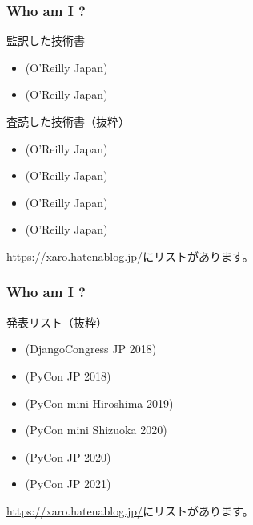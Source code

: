 \documentclass[aspectratio=169,dvipdfmx,12pt,notheorems]{beamer}
\theoremstyle{definition}
\begin{document}
\begin{frame}\frametitle{Who am I ?}

\begin{block}{監訳した技術書}
\begin{itemize}
\item {}(O'Reilly Japan) 
\item {}(O'Reilly Japan)
\end{itemize}
\end{block}

\begin{block}{査読した技術書（抜粋）}
\begin{itemize}
\item {}(O'Reilly Japan)
\item {}(O'Reilly Japan)
\item {}(O'Reilly Japan)
\item {}(O'Reilly Japan) 
\end{itemize}
\end{block}
\url{https://xaro.hatenablog.jp/}にリストがあります。
\end{frame}

\begin{frame}\frametitle{Who am I ?}

\begin{block}{発表リスト（抜粋）}
\begin{itemize}
\item {}(DjangoCongress JP 2018)
\item {}(PyCon JP 2018)
\item {}(PyCon mini Hiroshima 2019)
\item {}(PyCon mini Shizuoka 2020)
\item {}(PyCon JP 2020)
\item {}(PyCon JP 2021)
\end{itemize}
\end{block}
\url{https://xaro.hatenablog.jp/}にリストがあります。
\end{frame}
\end{document}
